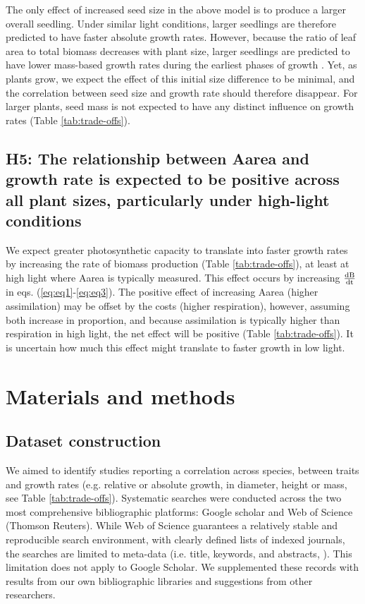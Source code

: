 \documentclass[a4paper,11pt]{article}
\begin{document}
The only effect of increased seed size in the above model is to produce a larger overall seedling. Under similar light conditions, larger seedlings are therefore predicted to have faster absolute growth rates. However, because the ratio of leaf area to total biomass decreases with plant size, larger seedlings are predicted to have lower mass-based growth rates during the earliest phases of growth \citep{Turnbull:2012ew}. Yet, as plants grow, we expect the effect of this initial size difference to be minimal, and the correlation between seed size and growth rate should therefore disappear. For larger plants, seed mass is not expected to have any distinct influence on growth rates  (Table \ref{tab:trade-offs}).

\subsection*{H5: The relationship between Aarea and growth rate is expected to be positive across all plant sizes, particularly under high-light conditions}

We expect greater photosynthetic capacity to translate into faster growth rates by increasing the rate of biomass production (Table \ref{tab:trade-offs}), at least at high light where Aarea is typically measured. This effect occurs by increasing  $\frac{\rm{d} B}{\rm{d} t} $ in eqs. (\ref{eq:eq1}-\ref{eq:eq3}). The positive effect of increasing Aarea (higher assimilation) may be offset by the costs (higher respiration), however, assuming both increase in proportion, and because assimilation is typically higher than respiration in high light, the net effect will be positive (Table \ref{tab:trade-offs}). It is uncertain how much this effect might translate to faster growth in low light.

\section*{Materials and methods}\label{material-and-methods}

\subsection*{Dataset construction}\label{data-construction}

We aimed to identify studies reporting a correlation across species, between traits and growth rates (e.g. relative or absolute growth, in diameter, height or mass, see Table \ref{tab:trade-offs}). Systematic searches were conducted across the two most comprehensive bibliographic platforms: Google scholar and Web of Science (Thomson Reuters). While Web of Science guarantees a relatively stable and reproducible search environment, with clearly defined lists of indexed journals, the searches are limited to meta-data (i.e. title, keywords, and abstracts, \citealt{Beckmann:2012hn}). This limitation does not apply to Google Scholar. We supplemented these records with results from our own bibliographic libraries and suggestions from other researchers.
\end{document}
